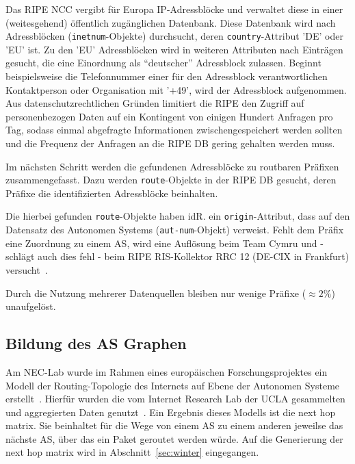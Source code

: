 Das RIPE NCC vergibt für Europa IP-Adressblöcke und verwaltet diese in einer (weitesgehend) öffentlich zugänglichen Datenbank.
Diese Datenbank wird nach Adressblöcken (\texttt{inetnum}-Objekte) durchsucht, deren \texttt{country}-Attribut 'DE' oder 'EU' ist.
Zu den 'EU' Adressblöcken wird in weiteren Attributen nach Einträgen gesucht, die eine Einordnung als "`deutscher"' Adressblock zulassen.
Beginnt beispielsweise die Telefonnummer einer für den Adressblock verantwortlichen Kontaktperson oder Organisation mit '+49', wird der Adressblock aufgenommen.
Aus datenschutzrechtlichen Gründen limitiert die RIPE den Zugriff auf personenbezogen Daten auf ein Kontingent von einigen Hundert Anfragen pro Tag, sodass einmal abgefragte Informationen zwischengespeichert werden sollten und die Frequenz der Anfragen an die RIPE DB gering gehalten werden muss.

Im nächsten Schritt werden die gefundenen Adressblöcke zu routbaren Präfixen zusammengefasst.
Dazu werden \texttt{route}-Objekte in der RIPE DB gesucht, deren Präfixe die identifizierten Adressblöcke beinhalten.


Die hierbei gefunden \texttt{route}-Objekte haben idR. ein \texttt{origin}-Attribut, dass auf den Datensatz des Autonomen Systems (\texttt{aut-num}-Objekt) verweist.
Fehlt dem Präfix eine Zuordnung zu einem AS, wird eine Auflösung beim Team Cymru und - schlägt auch dies fehl - beim RIPE RIS-Kollektor RRC 12 (DE-CIX in Frankfurt) versucht~\cite{RIPE:RIS, Cymru}.

Durch die Nutzung mehrerer Datenquellen bleiben nur wenige Präfixe ($\approx 2\%$) unaufgelöst.


\subsection{Bildung des AS Graphen}
\label{atlas:graph}

Am NEC-Lab wurde im Rahmen eines europäischen Forschungsprojektes ein Modell der Routing-Topologie des Internets auf Ebene der Autonomen Systeme erstellt~\cite{conf/pads/Winter09}.
Hierfür wurden die vom Internet Research Lab der UCLA gesammelten und aggregierten Daten genutzt~\cite{IRLtopology}.
Ein Ergebnis dieses Modells ist die next hop matrix.
Sie beinhaltet für die Wege von einem AS zu einem anderen jeweilse das nächste AS, über das ein Paket geroutet werden würde.
Auf die Generierung der next hop matrix wird in Abschnitt~\ref{sec:winter} eingegangen.

